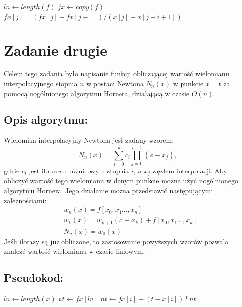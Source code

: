 \documentclass{article}
\begin{document}
\begin{algorithm}
    \DontPrintSemicolon
    \;
    $ ln \gets length(f)$
    $ fx  \gets copy(f)$
    \;
     {
         {
            $fx[j] = (fx[j] - fx[j - 1]) / (x[j] - x[j - i + 1])$
        }
    }
    \;
\end{algorithm}

\section{Zadanie drugie}
Celem tego zadania było napisanie funkcji obliczającej 
wartość wielomianu interpolacyjnego stopnia $n$ w postaci 
Newtona $N_n(x)$ w punkcie $x = t$ za pomocą uogólnionego 
algorytmu Hornera, działającą w czasie $O(n)$.
\newline

\subsection{Opis algorytmu:}
Wielomian interpolacyjny Newtona jest zadany wzorem:
\[N_n(x) = \sum_{i=0}^k c_i \prod_{j=0}^{i-1}(x - x_j) ,\]
gdzie $c_i$ jest ilorazem różnicowym stopnia $i$, a 
$x_j$ węzłem interpolacji.
\newline
Aby obliczyć wartość tego wielomianu w danym punkcie 
można użyć uogólnionego algorytmu Hornera. Jego działanie 
można przedstawić następującymi zależnościami:
$$
\begin{aligned}
    &w_n(x) = f[x_0, x_1 \dots, x_n] \\
    &w_k(x) = w_{k+1}(x-x_k) + f[x_0, x_1 \dots, x_k] \\
    &N_n(x) = w_0(x)
\end{aligned}
$$
Jeśli ilorazy są już obliczone, to zastosowanie powyższych wzorów 
pozwala znaleźć wartość wielomianu w czasie liniowym.
\newline
\newline
\newline
\subsection{Pseudokod:}\quad
\begin{algorithm}
    \DontPrintSemicolon
    \;
    $ln \gets length(x)$
    $nt \gets fx[ln]$
    \;
     {
        $nt \gets fx[i] + (t - x[i]) * nt$
    }
    \;
\end{algorithm}
\end{document}
